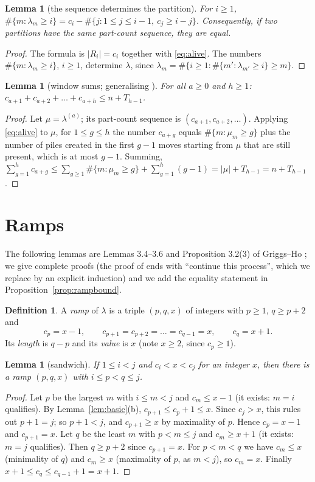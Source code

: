 \documentclass[11pt]{article}
\newtheorem{lemma}[theorem]{Lemma}
\theoremstyle{definition}
\newtheorem{definition}[theorem]{Definition}
\newcommand{\R}{R}
\renewcommand{\le}{\leqslant}
\renewcommand{\ge}{\geqslant}
\begin{document}
\begin{lemma}[the sequence determines the partition]\label{lem:determ}
For $i\ge1$, $\#\{m:\lambda_m\ge i\}=c_i-\#\{j:1\le j\le i-1,\ c_j\ge i-j\}$.  Consequently, if two partitions
have the same part-count sequence, they are equal.
\end{lemma}
\begin{proof}
The formula is $|\R_i|=c_i$ together with \eqref{eq:alive}.  The numbers $\#\{m:\lambda_m\ge i\}$, $i\ge1$,
determine $\lambda$, since $\lambda_m=\#\{i\ge1:\#\{m':\lambda_{m'}\ge i\}\ge m\}$.
\end{proof}

\begin{lemma}[window sums; generalising {\cite[Prop.~3.2(2)]{GH}}]\label{lem:window}
For all $a\ge0$ and $h\ge1$: $c_{a+1}+c_{a+2}+\dots+c_{a+h}\le n+T_{h-1}$.
\end{lemma}
\begin{proof}
Let $\mu=\lambda^{(a)}$; its part-count sequence is $(c_{a+1},c_{a+2},\dots)$.  Applying \eqref{eq:alive} to $\mu$,
for $1\le g\le h$ the number $c_{a+g}$ equals $\#\{m:\mu_m\ge g\}$ plus the number of piles created in the
first $g-1$ moves starting from $\mu$ that are still present, which is at most $g-1$.  Summing,
$\sum_{g=1}^h c_{a+g}\le\sum_{g\ge1}\#\{m:\mu_m\ge g\}+\sum_{g=1}^h(g-1)=|\mu|+T_{h-1}=n+T_{h-1}$.
\end{proof}

\section{Ramps}\label{sec:ramps}

The following lemmas are Lemmas 3.4--3.6 and Proposition 3.2(3) of Griggs--Ho \cite{GH}; we give complete
proofs (the proof of \cite[Lemma~3.5]{GH} ends with ``continue this process'', which we replace by an
explicit induction) and we add the equality statement in Proposition~\ref{prop:rampbound}.

\begin{definition}
A \emph{ramp} of $\lambda$ is a triple $(p,q,x)$ of integers with $p\ge1$, $q\ge p+2$ and
\[c_p=x-1,\qquad c_{p+1}=c_{p+2}=\dots=c_{q-1}=x,\qquad c_q=x+1 .\]
Its \emph{length} is $q-p$ and its \emph{value} is $x$ (note $x\ge2$, since $c_p\ge1$).
\end{definition}

\begin{lemma}[sandwich]\label{lem:sandwich}
If $1\le i<j$ and $c_i<x<c_j$ for an integer $x$, then there is a ramp $(p,q,x)$ with $i\le p<q\le j$.
\end{lemma}
\begin{proof}
Let $p$ be the largest $m$ with $i\le m<j$ and $c_m\le x-1$ (it exists: $m=i$ qualifies).  By
Lemma~\ref{lem:basic}(b), $c_{p+1}\le c_p+1\le x$.  Since $c_j>x$, this rules out $p+1=j$; so $p+1<j$, and
$c_{p+1}\ge x$ by maximality of $p$.  Hence $c_p=x-1$ and $c_{p+1}=x$.  Let $q$ be the least $m$ with $p<m\le j$ and
$c_m\ge x+1$ (it exists: $m=j$ qualifies).  Then $q\ge p+2$ since $c_{p+1}=x$.  For $p<m<q$ we have $c_m\le x$
(minimality of $q$) and $c_m\ge x$ (maximality of $p$, as $m<j$), so $c_m=x$.  Finally
$x+1\le c_q\le c_{q-1}+1=x+1$.
\end{proof}
\end{document}
